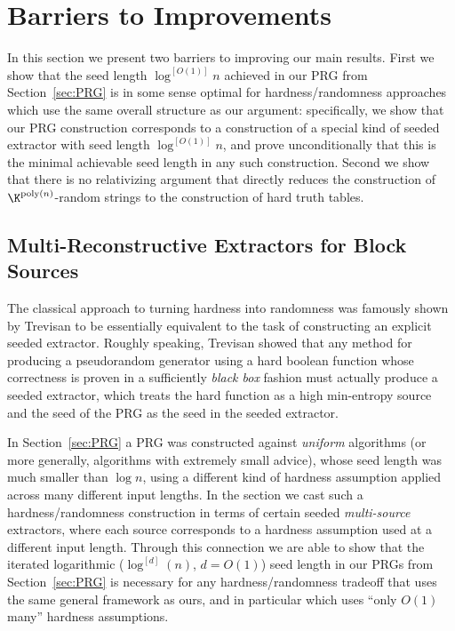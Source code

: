\documentclass[11pt]{article}
\renewcommand{\poly}{\mathrm{poly}}
\begin{document}
\section{Barriers to Improvements}
In this section we present two barriers to improving our main results. First we show that the seed length $\log^{[O(1)]}n$ achieved in our PRG from Section~\ref{sec:PRG} is in some sense optimal for hardness/randomness approaches which use the same overall structure as our argument: specifically, we show that our PRG construction corresponds to a construction of a special kind of seeded extractor with seed length $\log^{[O(1)]}n$, and prove unconditionally that this is the minimal achievable seed length in any such construction. Second we show that there is no relativizing argument that directly reduces the construction of $\K^{\poly(n)}$-random strings to the construction of hard truth tables.
\subsection{Multi-Reconstructive Extractors for Block Sources}
The classical approach to turning hardness into randomness \cite{NW94,IW97} was famously shown by Trevisan \cite{trevisan} to be essentially equivalent to the task of constructing an explicit seeded extractor. Roughly speaking, Trevisan showed that any method for producing a pseudorandom generator using a hard boolean function whose correctness is proven in a sufficiently \emph{black box} fashion must actually produce a seeded extractor, which treats the hard function as a high min-entropy source and the seed of the PRG as the seed in the seeded extractor. 

In Section~\ref{sec:PRG} a PRG was constructed against \emph{uniform} algorithms (or more generally, algorithms with extremely small advice), whose seed length was much smaller than $\log n$, using a different kind of hardness assumption applied across many different input lengths. In the section we cast such a hardness/randomness construction in terms of certain seeded \emph{multi-source} extractors, where each source corresponds to a hardness assumption used at a different input length. Through this connection we are able to show that the iterated logarithmic ($\log^{[d]}(n)$, $d= O(1)$) seed length in our PRGs from Section~\ref{sec:PRG} is necessary for any hardness/randomness tradeoff that uses the same general framework as ours, and in particular which uses ``only $O(1)$ many'' hardness assumptions.
\end{document}
